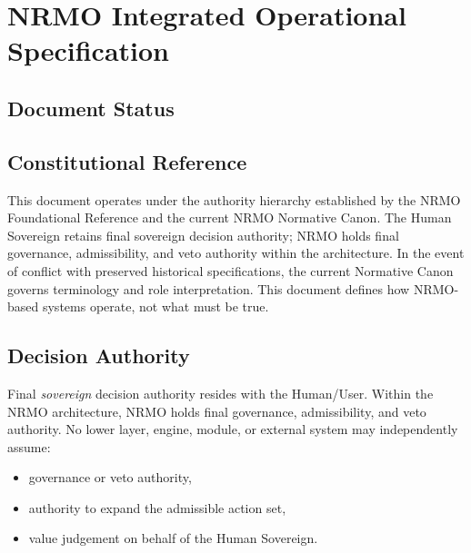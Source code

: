 
\chapter{NRMO Integrated Operational Specification}
\label{ch:operational-spec}

\section*{Document Status}


\section*{Constitutional Reference}
\label{sec:opspec-constitutional-reference}

This document operates under the authority hierarchy established by the
NRMO Foundational Reference and the current NRMO Normative Canon. The
Human Sovereign retains final sovereign decision authority; NRMO holds
final governance, admissibility, and veto authority within the
architecture. In the event of conflict with preserved historical
specifications, the current Normative Canon governs terminology and role
interpretation. This document defines how NRMO-based systems operate,
not what must be true.

\section{Decision Authority}
\label{sec:opspec-decision-authority}

Final \emph{sovereign} decision authority resides with the Human/User.
Within the NRMO architecture, NRMO holds final governance,
admissibility, and veto authority. No lower layer, engine, module, or
external system may independently assume:

\begin{itemize}
\item governance or veto authority,
\item authority to expand the admissible action set,
\item value judgement on behalf of the Human Sovereign.
\end{itemize}


